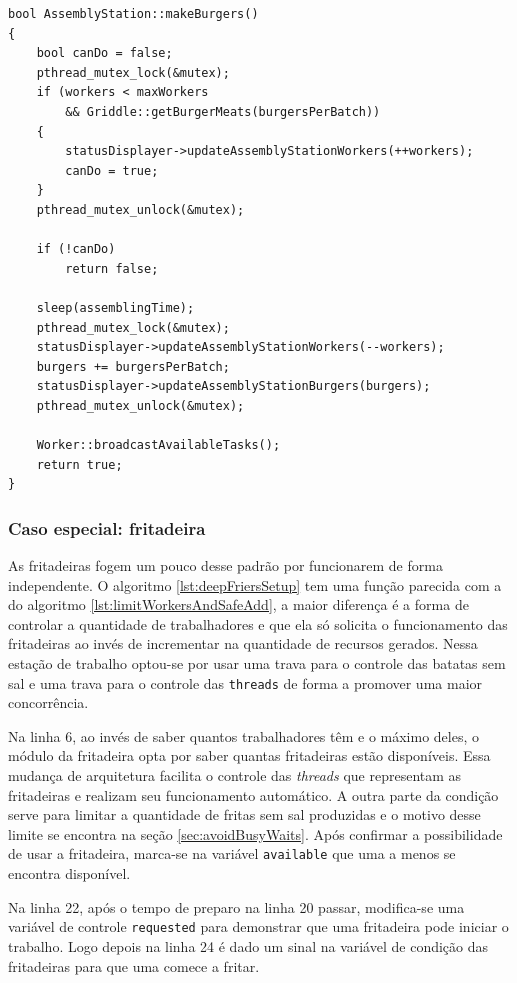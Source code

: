 \documentclass[a4paper]{article}
\begin{document}
\begin{lstlisting}[caption=Limitação de funcionários e adição segura de recursos na estação de montagem de hambúrgueres.\label{lst:limitWorkersAndSafeAdd}]
bool AssemblyStation::makeBurgers()
{
	bool canDo = false;
	pthread_mutex_lock(&mutex);
	if (workers < maxWorkers 
		&& Griddle::getBurgerMeats(burgersPerBatch))
	{
		statusDisplayer->updateAssemblyStationWorkers(++workers);
		canDo = true;
	}
	pthread_mutex_unlock(&mutex);
	
	if (!canDo)
		return false;
	
	sleep(assemblingTime);
	pthread_mutex_lock(&mutex);
	statusDisplayer->updateAssemblyStationWorkers(--workers);
	burgers += burgersPerBatch;
	statusDisplayer->updateAssemblyStationBurgers(burgers);
	pthread_mutex_unlock(&mutex);
	
	Worker::broadcastAvailableTasks();
	return true;
}
\end{lstlisting}

\subsubsection{Caso especial: fritadeira}
\label{sec:specialCaseDeepFriers}

As fritadeiras fogem um pouco desse padrão por funcionarem de forma independente. O algoritmo \ref{lst:deepFriersSetup} tem uma função parecida com a do algoritmo \ref{lst:limitWorkersAndSafeAdd}, a maior diferença é a forma de controlar a quantidade de trabalhadores e que ela só solicita o funcionamento das fritadeiras ao invés de incrementar na quantidade de recursos gerados. Nessa estação de trabalho optou-se por usar uma trava para o controle das batatas sem sal e uma trava para o controle das \texttt{threads} de forma a promover uma maior concorrência.

Na linha 6, ao invés de saber quantos trabalhadores têm e o máximo deles, o módulo da fritadeira opta por saber quantas fritadeiras estão disponíveis. Essa mudança de arquitetura facilita o controle das \textit{threads} que representam as fritadeiras e realizam seu funcionamento automático. A outra parte da condição serve para limitar a quantidade de fritas sem sal produzidas e o motivo desse limite se encontra na seção \ref{sec:avoidBusyWaits}. Após confirmar a possibilidade de usar a fritadeira, marca-se na variável \texttt{available} que uma a menos se encontra disponível. 

Na linha 22, após o tempo de preparo na linha 20 passar, modifica-se uma variável de controle \texttt{requested} para demonstrar que uma fritadeira pode iniciar o trabalho. Logo depois na linha 24 é dado um sinal na variável de condição das fritadeiras para que uma comece a fritar.
\end{document}
